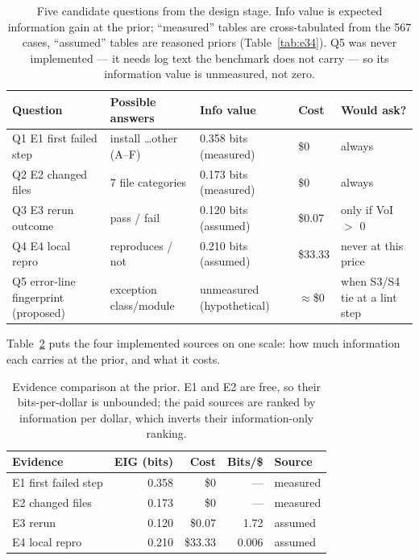 \documentclass{article}
\begin{document}
\begin{table}[t]
\centering
\small
\setlength{\tabcolsep}{5pt}
\begin{tabular}{lllll}
\toprule
Question & Possible answers & Info value & Cost & Would ask? \\
\midrule
Q1 E1 first failed step & install \dots other (A--F) & 0.358 bits (measured) & \$0 & always \\
Q2 E2 changed files & 7 file categories & 0.173 bits (measured) & \$0 & always \\
Q3 E3 rerun outcome & pass / fail & 0.120 bits (assumed) & \$0.07 & only if VoI $>$ 0 \\
Q4 E4 local repro & reproduces / not & 0.210 bits (assumed) & \$33.33 & never at this price \\
Q5 error-line fingerprint (proposed) & exception class/module & unmeasured (hypothetical) & $\approx$\$0 & when S3/S4 tie at a lint step \\
\bottomrule
\end{tabular}
\caption{Five candidate questions from the design stage. Info value is expected information gain at the prior; ``measured'' tables are cross-tabulated from the 567 cases, ``assumed'' tables are reasoned priors (Table~\ref{tab:e34}). Q5 was never implemented --- it needs log text the benchmark does not carry --- so its information value is unmeasured, not zero.}
\label{tab:candidates}
\end{table}

Table~\ref{tab:evidence} puts the four implemented sources on one scale: how much information each carries at the prior, and what it costs.

\begin{table}[t]
\centering
\small
\begin{tabular}{lrrrl}
\toprule
Evidence & EIG (bits) & Cost & Bits/\$ & Source \\
\midrule
E1 first failed step & 0.358 & \$0 & --- & measured \\
E2 changed files & 0.173 & \$0 & --- & measured \\
E3 rerun & 0.120 & \$0.07 & 1.72 & assumed \\
E4 local repro & 0.210 & \$33.33 & 0.006 & assumed \\
\bottomrule
\end{tabular}
\caption{Evidence comparison at the prior. E1 and E2 are free, so their bits-per-dollar is unbounded; the paid sources are ranked by information per dollar, which inverts their information-only ranking.}
\label{tab:evidence}
\end{table}
\end{document}
